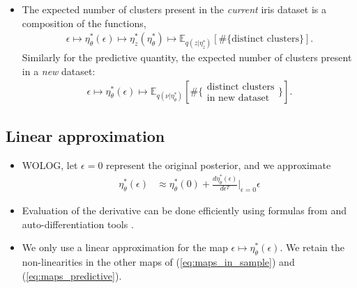 \documentclass[a0,plainsections,30pt]{sciposter}\usepackage[]{graphicx}\usepackage[]{color}
\newcommand{\Expect}{\mathbb{E}}
\newcommand{\etazopt}{\eta_z^{*}}
\newcommand{\etathetaopt}{\eta_\theta^{*}}
\begin{document}
\begin{minipage}[t]{0.45\textwidth}
\begin{itemize}
\item The expected number of clusters present in the {\itshape current} iris dataset is a composition of the functions, 
\vspace{-0.1in}
\begin{align}
\epsilon \mapsto
\etathetaopt(\epsilon) \mapsto
\etazopt\left(\etathetaopt\right) \mapsto
\Expect_{q(z | \etazopt)} \left[ \#\{\text{distinct clusters}\} \right].
\label{eq:maps_in_sample}
\end{align}
\vspace{-0.1in}
Similarly for the predictive quantity, the expected number of clusters present in a {\itshape new} dataset: 
\vspace{-0.1in}
\begin{align}
\epsilon \mapsto
\etathetaopt(\epsilon) \mapsto
\Expect_{q(\nu \vert \etathetaopt)} 
\left[\#\{\substack{\text{distinct clusters}\\\text{in new dataset}}\} \right].
\label{eq:maps_predictive}
\end{align}
\end{itemize}

\vspace{-0.9in}
\subsection*{Linear approximation}
\vspace{-0.2in}
\begin{itemize}
\item WOLOG, let $\epsilon=0$ represent the original posterior, and we approximate
\begin{align}
\etathetaopt(\epsilon)  &\approx  \etathetaopt(0) + 
\frac{d \etathetaopt(\epsilon)}{d\epsilon^T}\Big|_{\epsilon=0} \epsilon
\label{eq:linear_approx}
\end{align}

\item Evaluation of the derivative can be done efficiently using formulas from \cite{giordano:2017:covariances} and auto-differentiation tools \cite{maclaurin:2015:autograd}.
 
\item We only use a linear approximation for the map $\epsilon \mapsto \etathetaopt(\epsilon)$. {We retain the non-linearities in the other maps of (\ref{eq:maps_in_sample}) and (\ref{eq:maps_predictive}). }


\end{itemize}
\end{minipage}
\end{document}
